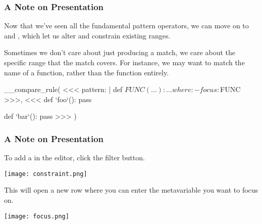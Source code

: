 \documentclass[aspectratio=169, handout]{beamer}
\begin{document}

\begin{frame}[fragile]
  \frametitle{A Note on Presentation}

  Now that we've seen all the fundamental pattern operators, we can move on to
   and , which let us alter and constrain
  existing ranges.

  \vspace{\fill}

  Sometimes we don't care about just producing a match, we care about the specific
  range that the match covers. For instance, we may want to match the name of a
  function, rather than the function entirely.

  \vspace{\fill}


  \vspace{\fill}

__compare_rule(
<<<
  pattern: |
    def $FUNC(...):
      ...
  where:
    - focus: $FUNC
>>>,
<<<
  def `foo`():
    pass

  def `bar`():
    pass
>>>
)
\end{frame}

\begin{frame}[fragile]
  \frametitle{A Note on Presentation}

  To add a  in the editor, click the filter button.

  \vspace{\fill}

  \begin{center}
    \texttt{[image: constraint.png]}
  \end{center}

  \vspace{\fill}

  This will open a new row where you can enter the metavariable you
  want to focus on.

  \vspace{\fill}

  \begin{center}
    \texttt{[image: focus.png]}
  \end{center}
\end{frame}
\end{document}
